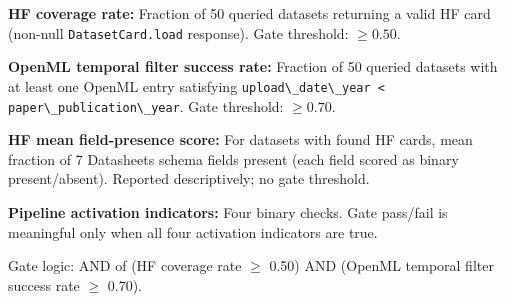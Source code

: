 \textbf{HF coverage rate:} Fraction of 50 queried datasets returning a valid HF card (non-null \texttt{DatasetCard.load} response). Gate threshold: $\geq 0.50$.

\textbf{OpenML temporal filter success rate:} Fraction of 50 queried datasets with at least one OpenML entry satisfying \texttt{upload\textbackslash \_date\textbackslash \_year < paper\textbackslash \_publication\textbackslash \_year}. Gate threshold: $\geq 0.70$.

\textbf{HF mean field-presence score:} For datasets with found HF cards, mean fraction of 7 Datasheets schema fields present (each field scored as binary present/absent). Reported descriptively; no gate threshold.

\textbf{Pipeline activation indicators:} Four binary checks. Gate pass/fail is meaningful only when all four activation indicators are true.

Gate logic: AND of (HF coverage rate $\geq$ 0.50) AND (OpenML temporal filter success rate $\geq$ 0.70).

